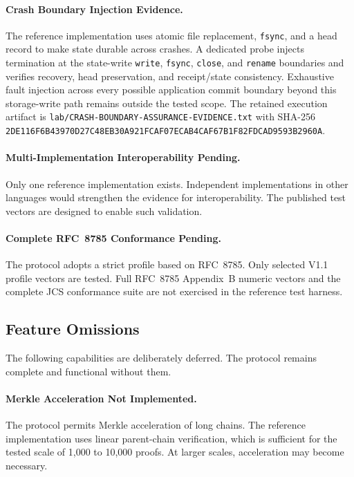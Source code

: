 \documentclass[11pt,a4paper]{article}
\begin{document}
\paragraph{Crash Boundary Injection Evidence.} The reference implementation uses atomic file replacement, \texttt{fsync}, and a head record to make state durable across crashes. A dedicated probe injects termination at the state-write \texttt{write}, \texttt{fsync}, \texttt{close}, and \texttt{rename} boundaries and verifies recovery, head preservation, and receipt/state consistency. Exhaustive fault injection across every possible application commit boundary beyond this storage-write path remains outside the tested scope. The retained execution artifact is \texttt{lab/CRASH-BOUNDARY-ASSURANCE-EVIDENCE.txt} with SHA-256 \texttt{2DE116F6B43970D27C48EB30A921FCAF07ECAB4CAF67B1F82FDCAD9593B2960A}.

\paragraph{Multi-Implementation Interoperability Pending.} Only one reference implementation exists. Independent implementations in other languages would strengthen the evidence for interoperability. The published test vectors are designed to enable such validation.

\paragraph{Complete RFC~8785 Conformance Pending.} The protocol adopts a strict profile based on RFC~8785. Only selected V1.1 profile vectors are tested. Full RFC~8785 Appendix~B numeric vectors and the complete JCS conformance suite are not exercised in the reference test harness.

\subsection{Feature Omissions}

The following capabilities are deliberately deferred. The protocol remains complete and functional without them.

\paragraph{Merkle Acceleration Not Implemented.} The protocol permits Merkle acceleration of long chains. The reference implementation uses linear parent-chain verification, which is sufficient for the tested scale of 1{,}000 to 10{,}000 proofs. At larger scales, acceleration may become necessary.
\end{document}
